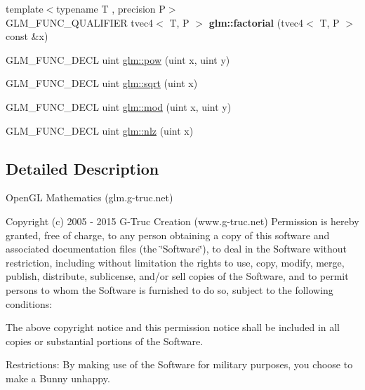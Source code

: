 \begin{DoxyCompactItemize}
\item 
\hypertarget{namespaceglm_a521766929c175b805ff9856d23c4e36c}{{\footnotesize template$<$typename T , precision P$>$ }\\G\-L\-M\-\_\-\-F\-U\-N\-C\-\_\-\-Q\-U\-A\-L\-I\-F\-I\-E\-R tvec4$<$ T, P $>$ {\bfseries glm\-::factorial} (tvec4$<$ T, P $>$ const \&x)}\label{namespaceglm_a521766929c175b805ff9856d23c4e36c}

\item 
G\-L\-M\-\_\-\-F\-U\-N\-C\-\_\-\-D\-E\-C\-L uint \hyperlink{group__gtx__integer_gaa8229e850c3cc4ad83492fe390ada044}{glm\-::pow} (uint x, uint y)
\item 
G\-L\-M\-\_\-\-F\-U\-N\-C\-\_\-\-D\-E\-C\-L uint \hyperlink{group__gtx__integer_ga457e9efca8339bf918d319e9c55f7c8f}{glm\-::sqrt} (uint x)
\item 
G\-L\-M\-\_\-\-F\-U\-N\-C\-\_\-\-D\-E\-C\-L uint \hyperlink{group__gtx__integer_gab8f9ec0ca93ca90669434224818f0750}{glm\-::mod} (uint x, uint y)
\item 
G\-L\-M\-\_\-\-F\-U\-N\-C\-\_\-\-D\-E\-C\-L uint \hyperlink{group__gtx__integer_gacbe62fd2384464c16ea30ecc4defc11c}{glm\-::nlz} (uint x)
\end{DoxyCompactItemize}


\subsection{Detailed Description}
Open\-G\-L Mathematics (glm.\-g-\/truc.\-net)

Copyright (c) 2005 -\/ 2015 G-\/\-Truc Creation (www.\-g-\/truc.\-net) Permission is hereby granted, free of charge, to any person obtaining a copy of this software and associated documentation files (the \char`\"{}\-Software\char`\"{}), to deal in the Software without restriction, including without limitation the rights to use, copy, modify, merge, publish, distribute, sublicense, and/or sell copies of the Software, and to permit persons to whom the Software is furnished to do so, subject to the following conditions\-:

The above copyright notice and this permission notice shall be included in all copies or substantial portions of the Software.

Restrictions\-: By making use of the Software for military purposes, you choose to make a Bunny unhappy.

